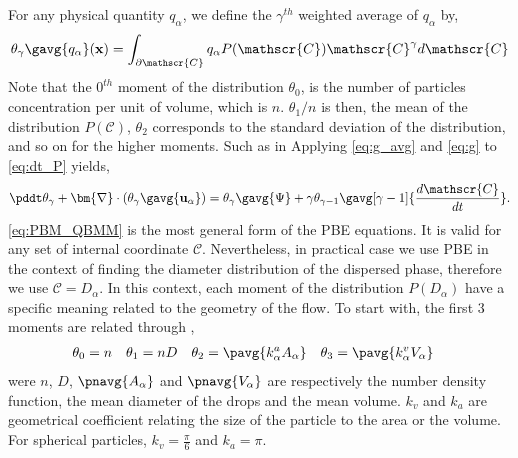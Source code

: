 For any physical quantity $q_\alpha$, we define the $\gamma^{th}$ weighted average of $q_\alpha$ by,
\begin{equation}
    \theta_{\gamma}\gavg{q_\alpha}(\textbf{x})  = \int_{\partial \mathscr{C}} q_\alpha P(\mathscr{C})\mathscr{C}^\gamma d\mathscr{C}
    \label{eq:g_avg}
\end{equation}
Note that the $0^{th}$ moment of the distribution $\theta_0$, is the number of particles concentration per unit of volume, which is $n$.
$\theta_1/n$ is then, the mean of the distribution $P(\mathscr{C})$, $\theta_2$ corresponds to the standard deviation of the distribution, and so on for the higher moments. 
Such as in 
Applying \ref{eq:g_avg} and \ref{eq:g} to \ref{eq:dt_P} yields,
\begin{equation}
    \label{eq:PBM_QBMM}
    \pddt \theta_{\gamma}  
    + \bm{\nabla} \cdot \left(\theta_\gamma \gavg{\textbf{u}_\alpha}\right)  
    = \theta_{\gamma} \gavg{\Psi} 
    +\gamma \theta_{\gamma-1} \gavg[\gamma-1]{\frac{d \mathscr{C}}{dt}}. 
\end{equation}
\ref{eq:PBM_QBMM} is the most general form of the PBE equations. 
It is valid for any set of internal coordinate $\mathscr{C}$.
Nevertheless, in practical case we use PBE in the context of finding the diameter distribution of the dispersed phase, therefore we use  $\mathscr{C} = D_\alpha$.
In this context, each moment of the distribution $P(D_\alpha)$ have a specific meaning related to the geometry of the flow. 
To start with, the first $3$ moments are related through \citep{morel2010comparison,KAMP20011363,zaepffel2011modelisation},
\begin{align}
    &\theta_0 = n&
    &\theta_1 = n D&
    &\theta_2 =  \pavg{k^a_\alpha A_\alpha}& 
    &\theta_3 =  \pavg{k^v_\alpha V_\alpha}&
    \label{eq:relation}
\end{align}
were $n$, $D$, $\pnavg{A_\alpha}$ and $\pnavg{V_\alpha}$ are respectively the number density function, the mean diameter of the drops and the mean volume. 
$k_v$ and $k_a$ are geometrical coefficient relating the size of the particle to the area or the volume. 
For spherical particles, $k_v = \frac{\pi}{6}$ and $k_a = \pi$.

